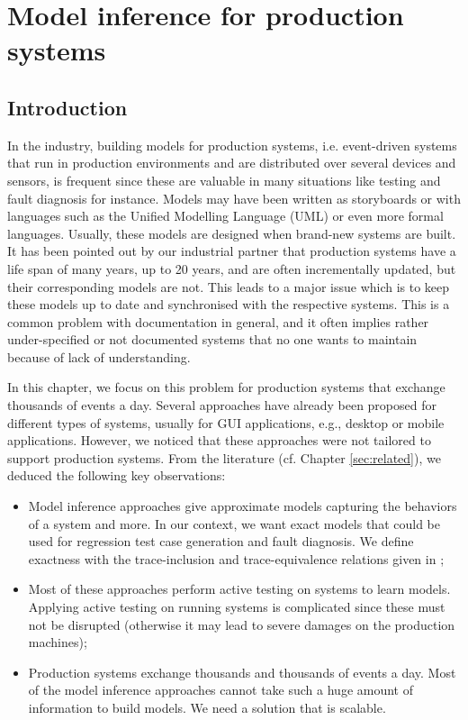 \chapter{Model inference for production systems}
\label{sec:modelinf:prodsystems}

\minitoc

\section{Introduction}

In the industry, building models for production systems, i.e.
event-driven systems that run in production environments and are
distributed over several devices and sensors, is frequent since
these are valuable in many situations like testing and fault
diagnosis for instance. Models may have been written as
storyboards or with languages such as the Unified Modelling
Language (UML) or even more formal languages. Usually, these
models are designed when brand-new systems are built. It has been
pointed out by our industrial partner that production systems
have a life span of many years, up to 20 years, and are often
incrementally updated, but their corresponding models are not.
This leads to a major issue which is to keep these models up to
date and synchronised with the respective systems. This is a
common problem with documentation in general, and it often
implies rather under-specified or not documented systems that no
one wants to maintain because of lack of understanding.

In this chapter, we focus on this problem for production systems
that exchange thousands of events a day. Several approaches have
already been proposed for different types of systems, usually for
GUI applications, e.g., desktop or mobile applications. However,
we noticed that these approaches were not tailored to support
production systems. From the literature (cf. Chapter
\ref{sec:related}), we deduced the following key observations:

\begin{itemize}
    \item Model inference approaches give approximate models
        capturing the behaviors of a system and more. In our
        context, we want exact models that could be used for
        regression test case generation and fault diagnosis. We
        define exactness with the trace-inclusion and
        trace-equivalence relations given in \cite{petrenko06};

    \item Most of these approaches perform active testing on
        systems to learn models. Applying active testing on
        running systems is complicated since these must not be
        disrupted (otherwise it may lead to severe damages on the
        production machines);

    \item Production systems exchange thousands and thousands of
        events a day. Most of the model inference approaches
        cannot take such a huge amount of information to build
        models. We need a solution that is scalable.
\end{itemize}


